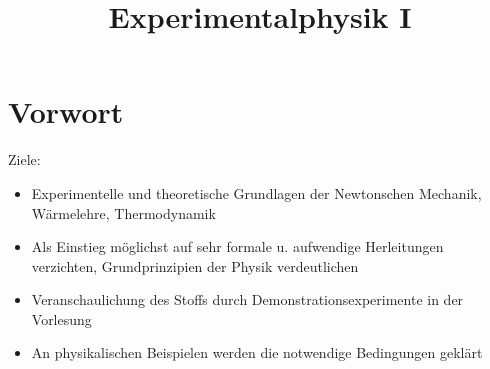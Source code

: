 \documentclass[a4paper,10pt]{scrartcl}
\title{Experimentalphysik I}
\begin{document}
\maketitle

\tableofcontents

\newpage

\section*{Vorwort}
\begin{seg}{Ziele:}
\begin{itemize}
\item Experimentelle und theoretische Grundlagen der Newtonschen Mechanik, Wärmelehre, Thermodynamik
\item Als Einstieg möglichst auf sehr formale u. aufwendige Herleitungen verzichten, Grundprinzipien der Physik verdeutlichen
\item Veranschaulichung des Stoffs durch Demonstrationsexperimente in der Vorlesung
\item An physikalischen Beispielen werden die notwendige Bedingungen geklärt
\end{itemize}
\end{seg}
\end{document}
